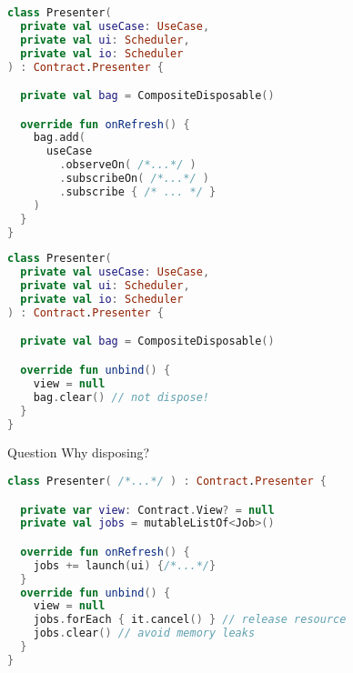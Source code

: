 \documentclass[10pt]{beamer}
\begin{document}
\begin{frame}[fragile]
\begin{lstlisting}[language=Kotlin, basicstyle=\ttfamily]
class Presenter(
  private val useCase: UseCase,
  private val ui: Scheduler,
  private val io: Scheduler
) : Contract.Presenter {

  private val bag = CompositeDisposable()

  override fun onRefresh() {
    bag.add(
      useCase
        .observeOn( /*...*/ )
        .subscribeOn( /*...*/ )
        .subscribe { /* ... */ }
    )
  }
}
\end{lstlisting}
\end{frame}




\begin{frame}[fragile]
\begin{lstlisting}[language=Kotlin, basicstyle=\ttfamily]
class Presenter(
  private val useCase: UseCase,
  private val ui: Scheduler,
  private val io: Scheduler
) : Contract.Presenter {

  private val bag = CompositeDisposable()

  override fun unbind() {
    view = null
    bag.clear() // not dispose!
  }
}
\end{lstlisting}
\end{frame}

\begin{frame}[fragile]
	\begin{alertblock}{Question}
Why disposing?
\end{alertblock}
\end{frame}

\begin{frame}[fragile]
\begin{lstlisting}[language=Kotlin, basicstyle=\ttfamily]
class Presenter( /*...*/ ) : Contract.Presenter {

  private var view: Contract.View? = null
  private val jobs = mutableListOf<Job>()

  override fun onRefresh() {
    jobs += launch(ui) {/*...*/}
  }
  override fun unbind() {
    view = null
    jobs.forEach { it.cancel() } // release resource 
    jobs.clear() // avoid memory leaks
  }
}
\end{lstlisting}
\end{frame}
\end{document}
